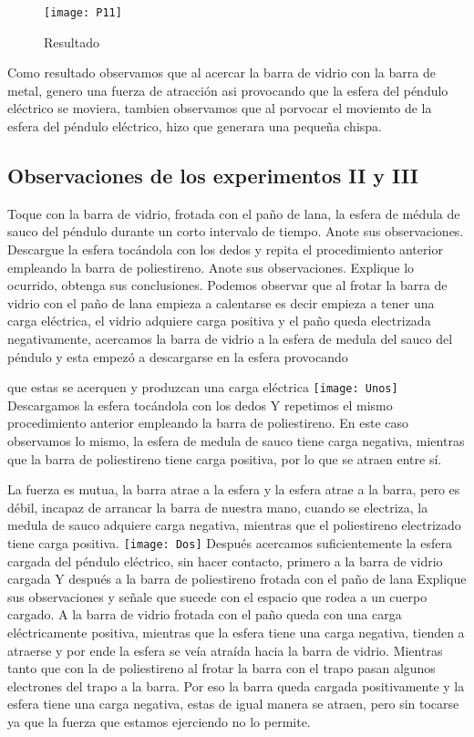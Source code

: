 \documentclass[14pt]{article}
\begin{document}
\begin{figure}[h]
\centering
\texttt{[image: P11]}
\caption{Resultado}
\end{figure}

Como resultado observamos que al acercar la barra de vidrio con la barra de metal, genero una fuerza de atracción asi provocando que la esfera del péndulo eléctrico se moviera, tambien observamos que al porvocar el moviemto de la esfera del péndulo eléctrico, hizo que generara una pequeña chispa.
\subsection{Observaciones de los experimentos II y III}
Toque con la barra de vidrio, frotada con el paño de lana, la esfera de médula de sauco del péndulo durante un corto intervalo de tiempo. Anote sus observaciones. Descargue la esfera tocándola con los dedos y repita el procedimiento anterior empleando la barra de poliestireno. Anote sus observaciones. Explique lo ocurrido, obtenga sus conclusiones.
Podemos observar que al frotar la barra de vidrio con el paño de lana empieza a calentarse es decir empieza a tener una carga eléctrica, el vidrio adquiere carga positiva y el paño queda electrizada negativamente, acercamos la barra de vidrio a la esfera de medula del sauco del péndulo y esta empezó a descargarse en la esfera provocando 

que estas se acerquen y produzcan una carga eléctrica
\texttt{[image: Unos]}
Descargamos la esfera tocándola con los dedos
Y repetimos el mismo procedimiento anterior empleando la barra de poliestireno. 
En este caso observamos lo mismo, la esfera de medula de sauco tiene carga negativa, mientras que la barra de poliestireno tiene carga positiva, por lo que se atraen entre sí.

La fuerza es mutua, la barra atrae a la esfera y la esfera atrae a la barra, pero es débil, incapaz de arrancar la barra de nuestra mano, cuando se electriza, la medula de sauco adquiere carga negativa, mientras que el poliestireno electrizado tiene carga positiva.
\texttt{[image: Dos]}
Después acercamos suficientemente la esfera cargada del péndulo eléctrico, sin hacer contacto, primero a la barra de vidrio cargada
Y después a la barra de poliestireno frotada con el paño de lana
 Explique sus observaciones y señale que sucede con el espacio que rodea a un cuerpo cargado.
A la barra de vidrio frotada con el paño queda con una carga eléctricamente positiva, mientras que la esfera tiene una carga negativa, tienden a atraerse y por ende la esfera se veía atraída hacia la barra de vidrio.
Mientras tanto que con la de poliestireno al frotar la barra con el trapo pasan algunos electrones del trapo a la barra. Por eso la barra queda cargada positivamente y la esfera tiene una carga negativa, estas de igual manera se atraen, pero sin tocarse ya que la fuerza que estamos ejerciendo no lo permite.
\end{document}
